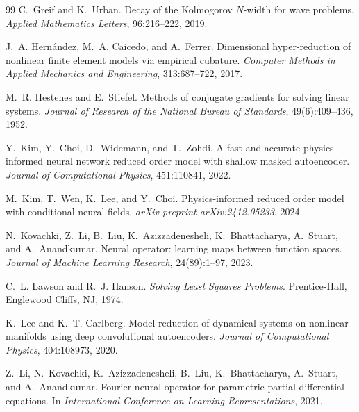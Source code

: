 \begin{thebibliography}{99}
C.~Greif and K.~Urban.
\newblock Decay of the Kolmogorov $N$-width for wave problems.
\newblock \emph{Applied Mathematics Letters}, 96:216--222, 2019.

J.~A. Hern\'andez, M.~A. Caicedo, and A.~Ferrer.
\newblock Dimensional hyper-reduction of nonlinear finite element
models via empirical cubature.
\newblock \emph{Computer Methods in Applied Mechanics and Engineering},
313:687--722, 2017.

M.~R. Hestenes and E.~Stiefel.
\newblock Methods of conjugate gradients for solving linear systems.
\newblock \emph{Journal of Research of the National Bureau of Standards},
49(6):409--436, 1952.

Y.~Kim, Y.~Choi, D.~Widemann, and T.~Zohdi.
\newblock A fast and accurate physics-informed neural network reduced
order model with shallow masked autoencoder.
\newblock \emph{Journal of Computational Physics}, 451:110841, 2022.

M.~Kim, T.~Wen, K.~Lee, and Y.~Choi.
\newblock Physics-informed reduced order model with conditional neural
fields.
\newblock \emph{arXiv preprint arXiv:2412.05233}, 2024.

N.~Kovachki, Z.~Li, B.~Liu, K.~Azizzadenesheli, K.~Bhattacharya,
A.~Stuart, and A.~Anandkumar.
\newblock Neural operator: learning maps between function spaces.
\newblock \emph{Journal of Machine Learning Research}, 24(89):1--97,
2023.

C.~L. Lawson and R.~J. Hanson.
\newblock \emph{Solving Least Squares Problems}.
\newblock Prentice-Hall, Englewood Cliffs, NJ, 1974.

K.~Lee and K.~T. Carlberg.
\newblock Model reduction of dynamical systems on nonlinear manifolds
using deep convolutional autoencoders.
\newblock \emph{Journal of Computational Physics}, 404:108973, 2020.

Z.~Li, N.~Kovachki, K.~Azizzadenesheli, B.~Liu, K.~Bhattacharya,
A.~Stuart, and A.~Anandkumar.
\newblock Fourier neural operator for parametric partial differential
equations.
\newblock In \emph{International Conference on Learning Representations},
2021.


\end{thebibliography}
